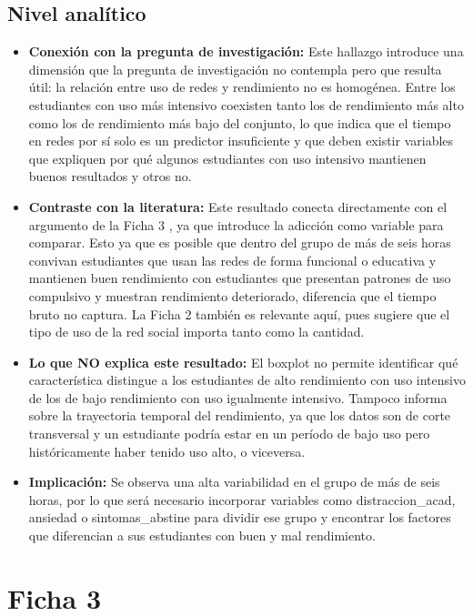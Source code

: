 \documentclass[12pt]{article}
\begin{document}
\subsection*{Nivel analítico}
\begin{itemize}
    \item \textbf{Conexión con la pregunta de investigación:} Este hallazgo introduce una dimensión que la pregunta de investigación no contempla pero que resulta útil: la relación entre uso de redes y rendimiento no es homogénea. Entre los estudiantes con uso más intensivo coexisten tanto los de rendimiento más alto como los de rendimiento más bajo del conjunto, lo que indica que el tiempo en redes por sí solo es un predictor insuficiente y que deben existir variables que expliquen por qué algunos estudiantes con uso intensivo mantienen buenos resultados y otros no.
    \item \textbf{Contraste con la literatura: } Este resultado conecta directamente con el argumento de la Ficha 3 \cite{aljemely2020b}, ya que introduce la adicción como variable para comparar. Esto ya que es posible que dentro del grupo de más de seis horas convivan estudiantes que usan las redes de forma funcional o educativa y mantienen buen rendimiento con estudiantes que presentan patrones de uso compulsivo y muestran rendimiento deteriorado, diferencia que el tiempo bruto no captura. La Ficha 2 \cite{santos2010} también es relevante aquí, pues sugiere que el tipo de uso de la red social importa tanto como la cantidad.
    
    \item \textbf{Lo que NO explica este resultado: } El boxplot no permite identificar qué característica distingue a los estudiantes de alto rendimiento con uso intensivo de los de bajo rendimiento con uso igualmente intensivo. Tampoco informa sobre la trayectoria temporal del rendimiento, ya que los datos son de corte transversal y un estudiante podría estar en un período de bajo uso pero históricamente haber tenido uso alto, o viceversa.

    \item \textbf{Implicación:} Se observa una alta variabilidad en el grupo de más de seis horas, por lo que será necesario incorporar variables como distraccion\_acad, ansiedad o sintomas\_abstine para dividir ese grupo y encontrar los factores que diferencian a sus estudiantes con buen y mal rendimiento.
    
\end{itemize}

\section*{Ficha 3}
\end{document}
